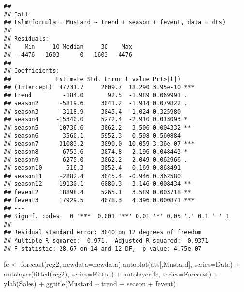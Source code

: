 \documentclass[
]{article}
\newenvironment{Shaded}{\begin{snugshade}}{\end{snugshade}}
\newcommand{\AttributeTok}[1]{\textcolor[rgb]{0.77,0.63,0.00}{#1}}
\newcommand{\FunctionTok}[1]{\textcolor[rgb]{0.00,0.00,0.00}{#1}}
\newcommand{\NormalTok}[1]{#1}
\newcommand{\OtherTok}[1]{\textcolor[rgb]{0.56,0.35,0.01}{#1}}
\newcommand{\SpecialCharTok}[1]{\textcolor[rgb]{0.00,0.00,0.00}{#1}}
\newcommand{\StringTok}[1]{\textcolor[rgb]{0.31,0.60,0.02}{#1}}
\begin{document}
\begin{verbatim}
## 
## Call:
## tslm(formula = Mustard ~ trend + season + fevent, data = dts)
## 
## Residuals:
##    Min     1Q Median     3Q    Max 
##  -4476  -1603      0   1603   4476 
## 
## Coefficients:
##             Estimate Std. Error t value Pr(>|t|)    
## (Intercept)  47731.7     2609.7  18.290 3.95e-10 ***
## trend         -184.0       92.5  -1.989 0.069991 .  
## season2      -5819.6     3041.2  -1.914 0.079822 .  
## season3      -3118.9     3045.4  -1.024 0.325980    
## season4     -15340.0     5272.4  -2.910 0.013093 *  
## season5      10736.6     3062.2   3.506 0.004332 ** 
## season6       3560.1     5952.3   0.598 0.560884    
## season7      31083.2     3090.0  10.059 3.36e-07 ***
## season8       6753.6     3074.8   2.196 0.048443 *  
## season9       6275.0     3062.2   2.049 0.062966 .  
## season10      -516.3     3052.4  -0.169 0.868491    
## season11     -2882.4     3045.4  -0.946 0.362580    
## season12    -19130.1     6080.3  -3.146 0.008434 ** 
## fevent2      18898.4     5265.1   3.589 0.003718 ** 
## fevent3      17929.5     4078.3   4.396 0.000871 ***
## ---
## Signif. codes:  0 '***' 0.001 '**' 0.01 '*' 0.05 '.' 0.1 ' ' 1
## 
## Residual standard error: 3040 on 12 degrees of freedom
## Multiple R-squared:  0.971,  Adjusted R-squared:  0.9371 
## F-statistic: 28.67 on 14 and 12 DF,  p-value: 4.75e-07
\end{verbatim}

\begin{Shaded}
\begin{Highlighting}[]
\NormalTok{fc }\OtherTok{\textless{}{-}} \FunctionTok{forecast}\NormalTok{(reg2, }\AttributeTok{newdata=}\NormalTok{newdata)}
\FunctionTok{autoplot}\NormalTok{(dts[,}\StringTok{\textquotesingle{}Mustard\textquotesingle{}}\NormalTok{], }\AttributeTok{series=}\StringTok{\textquotesingle{}Data\textquotesingle{}}\NormalTok{) }\SpecialCharTok{+}
  \FunctionTok{autolayer}\NormalTok{(}\FunctionTok{fitted}\NormalTok{(reg2), }\AttributeTok{series=}\StringTok{\textquotesingle{}Fitted\textquotesingle{}}\NormalTok{) }\SpecialCharTok{+} 
  \FunctionTok{autolayer}\NormalTok{(fc, }\AttributeTok{series=}\StringTok{\textquotesingle{}Forecast\textquotesingle{}}\NormalTok{) }\SpecialCharTok{+}
  \FunctionTok{ylab}\NormalTok{(}\StringTok{\textquotesingle{}Sales\textquotesingle{}}\NormalTok{) }\SpecialCharTok{+}
  \FunctionTok{ggtitle}\NormalTok{(}\StringTok{\textquotesingle{}Mustard \textasciitilde{} trend + season + fevent\textquotesingle{}}\NormalTok{)}
\end{Highlighting}
\end{Shaded}
\end{document}
